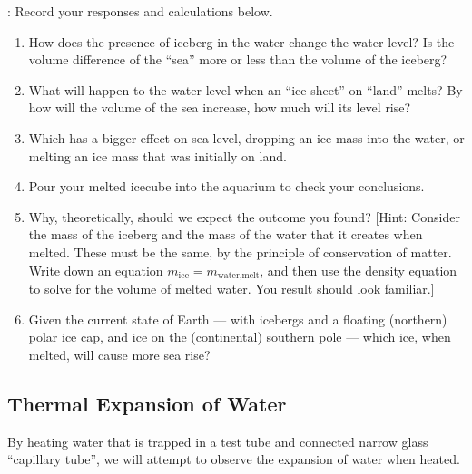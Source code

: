 : Record your responses and calculations below.
	\begin{enumerate}
	\item How does the presence of iceberg in the water change the water level?  Is the volume difference of the ``sea'' more or less than the volume of the iceberg?
	\item What will happen to the water level when an ``ice sheet'' on ``land'' melts?  By how will the volume of the sea increase, how much will its level rise?
	\item Which has a bigger effect on sea level, dropping an ice mass into the water, or melting an ice mass that was initially on land.
	\item Pour your melted icecube into the aquarium to check your conclusions.
	\item Why, theoretically, should we expect the outcome you found? [Hint: Consider the mass of the iceberg and the mass of the water that it creates when melted.  These must be the same, by the principle of conservation of matter.  Write down an equation $m_\text{ice} = m_\text{water,melt}$, and then use the density equation to solve for the volume of melted water.  You result should look familiar.]
	\item Given the current state of Earth --- with icebergs and a floating (northern) polar ice cap, and ice on the (continental) southern pole --- which ice, when melted, will cause more sea rise?
	\end{enumerate}
	
	
\newpage
\subsection{Thermal Expansion of Water}

By heating water that is trapped in a test tube and connected narrow glass ``capillary tube'', we will attempt to observe the expansion of water when heated.

